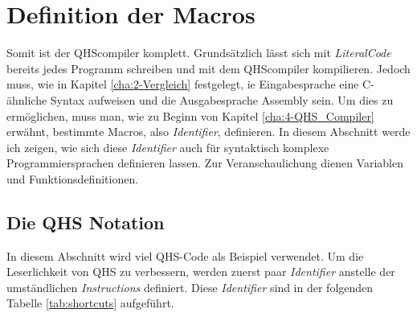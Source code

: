 \section{Definition der Macros} \label{sec:qhs-macro_definitions}
Somit ist der QHScompiler komplett. Grundsätzlich lässt sich mit \textit{LiteralCode} bereits jedes Programm schreiben und mit dem QHScompiler kompilieren. 
Jedoch muss, wie in Kapitel \ref{cha:2-Vergleich} festgelegt, ie Eingabesprache eine C-ähnliche Syntax aufweisen und die Ausgabesprache Assembly sein.
Um dies zu ermöglichen, muss man, wie zu Beginn von Kapitel \ref{cha:4-QHS_Compiler} erwähnt, bestimmte Macros, also \textit{Identifier}, definieren.
In diesem Abschnitt werde ich zeigen, wie sich diese \textit{Identifier} auch für syntaktisch komplexe Programmiersprachen definieren lassen.
Zur Veranschaulichung dienen Variablen und Funktionsdefinitionen.

\subsection{Die QHS Notation} \label{sec:qhs-notation}
In diesem Abschnitt wird viel QHS-Code als Beispiel verwendet.
Um die Leserlichkeit von QHS zu verbessern, werden zuerst paar \textit{Identifier} anstelle der umständlichen \textit{Instructions} definiert.
Diese \textit{Identifier} sind in der folgenden Tabelle \ref{tab:shortcuts} aufgeführt.


